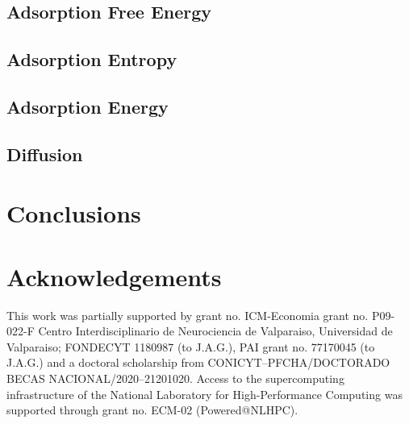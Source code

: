 \documentclass[twoside,twocolumn,9pt]{article}
\begin{document}
\subsection{Adsorption Free Energy}

\subsection{Adsorption Entropy}

\subsection{Adsorption Energy}

\subsection{Diffusion}

\section{Conclusions}


\section*{Acknowledgements}
This work was partially supported by grant no. ICM-Economia grant
no. P09-022-F Centro Interdisciplinario de Neurociencia de Valparaiso,
Universidad de Valparaiso; FONDECYT 1180987 (to J.A.G.), PAI grant
no. 77170045 (to J.A.G.) and a doctoral scholarship from
CONICYT--PFCHA/DOCTORADO BECAS NACIONAL/2020--21201020.  Access to the
supercomputing infrastructure of the National Laboratory for
High-Performance Computing was supported through grant no. ECM-02
(Powered@NLHPC).




\end{document}
